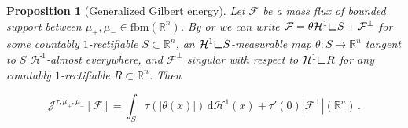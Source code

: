 \documentclass[10pt,a4paper,oneside,final]{article}
\newcommand{\R}{{\mathbb{R}}}
\newcommand{\de}{{\mathrm{d}}}
\DeclareMathOperator{\dv}{div}
\newcommand{\hdone}{\mathcal{H}^1}
\newcommand{\fbm}{{\mathrm{fbm}}}
\newcommand{\restr}{{\mbox{\LARGE$\llcorner$}}}
\newcommand{\flux}{{\mathcal{F}}}
\newcommand{\JEn}{{\mathcal{J}}}
\numberwithin{equation}{section}
\theoremstyle{plain}
\newtheorem{proposition}[theorem]{Proposition}
\theoremstyle{definition}
\theoremstyle{remark}
\newcommand{\notinclude}[1]{}
\begin{document}
\begin{proposition}[Generalized Gilbert energy]\label{thm:GilbertFlux}
% 
Let $\flux$ be a mass flux of bounded support between $\mu_+,\mu_-\in\fbm(\R^n)$.
By \cite[Thm.\,5.5]{Si07} or \cite[Thm.\,4.2]{Sil08} we can write $\flux=\theta\hdone\restr S+\flux^\perp$ for some countably $1$-rectifiable $S\subset\R^n$, an $\hdone\restr S$-measurable map $\theta:S\to\R^n$ tangent to $S$ $\hdone$-almost everywhere,
and $\flux^\perp$ singular with respect to $\hdone\restr R$ for any countably $1$-rectifiable $R\subset\R^n$.
Then

\notinclude{If $\flux$ has bounded support, we have}%
\begin{equation*}
\JEn^{\tau,\mu_+,\mu_-}[\flux]
=\int_{S}\tau(|\theta(x)|)\,\de\hdone(x)+\tau'(0)|\flux^\perp|(\R^n)\,.
\end{equation*}
\notinclude{if $\dv\flux=\mu_+-\mu_-$, $|\flux|(\R^n)<\infty$, and $\flux=\theta\hdone\restr S+\flux^\perp$ for some countably $1$-rectifiable $S\subset\R^n$, an $\hdone\restr S$-measurable map $\theta:S\to\R^n$ tangent to $S$ $\hdone$-almost everywhere,
and $\flux^\perp$ singular with respect to $\hdone\restr R$ for any countably $1$-rectifiable $R\subset\R^n$.
Otherwise, $\JEn^{\tau,\mu_+,\mu_-}[\flux]=\infty$.}%
\end{proposition}
\end{document}
